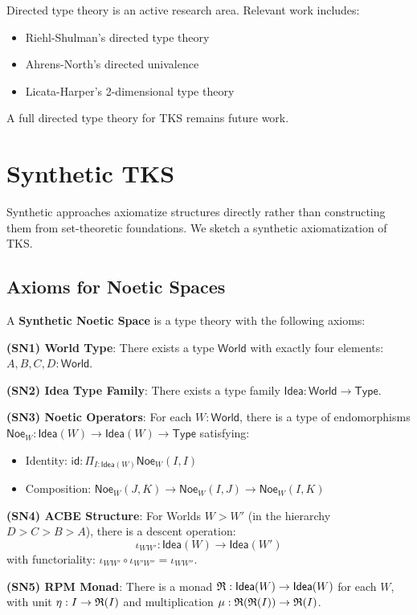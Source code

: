 \begin{remark}
\label{rem:directed-research}
Directed type theory is an active research area. Relevant work includes:
\begin{itemize}
  \item Riehl-Shulman's directed type theory
  \item Ahrens-North's directed univalence
  \item Licata-Harper's 2-dimensional type theory
\end{itemize}
A full directed type theory for TKS remains future work.
\end{remark}

\section{Synthetic TKS}
\label{sec:synthetic-tks}

Synthetic approaches axiomatize structures directly rather than constructing
them from set-theoretic foundations. We sketch a synthetic axiomatization of TKS.

\subsection{Axioms for Noetic Spaces}
\label{subsec:axioms-noetic}

\begin{definition}
\label{def:synthetic-noetic-axioms}
A \textbf{Synthetic Noetic Space} is a type theory with the following axioms:

\textbf{(SN1) World Type}: There exists a type $\mathsf{World}$ with exactly
four elements: $A, B, C, D : \mathsf{World}$.

\textbf{(SN2) Idea Type Family}: There exists a type family
$\mathsf{Idea} : \mathsf{World} \to \mathsf{Type}$.

\textbf{(SN3) Noetic Operators}: For each $W : \mathsf{World}$, there is a type
of endomorphisms $\mathsf{Noe}_W : \mathsf{Idea}(W) \to \mathsf{Idea}(W) \to \mathsf{Type}$
satisfying:
\begin{itemize}
  \item Identity: $\mathsf{id} : \Pi_{I : \mathsf{Idea}(W)} \mathsf{Noe}_W(I, I)$
  \item Composition: $\mathsf{Noe}_W(J, K) \to \mathsf{Noe}_W(I, J) \to \mathsf{Noe}_W(I, K)$
\end{itemize}

\textbf{(SN4) ACBE Structure}: For Worlds $W > W'$ (in the hierarchy $D > C > B > A$),
there is a descent operation:
\[
  \iota_{WW'} : \mathsf{Idea}(W) \to \mathsf{Idea}(W')
\]
with functoriality: $\iota_{WW'} \circ \iota_{W'W''} = \iota_{WW''}$.

\textbf{(SN5) RPM Monad}: There is a monad $\mathfrak{R} : \mathsf{Idea}(W) \to \mathsf{Idea}(W)$
for each $W$, with unit $\eta : I \to \mathfrak{R}(I)$ and multiplication
$\mu : \mathfrak{R}(\mathfrak{R}(I)) \to \mathfrak{R}(I)$.
\end{definition}

